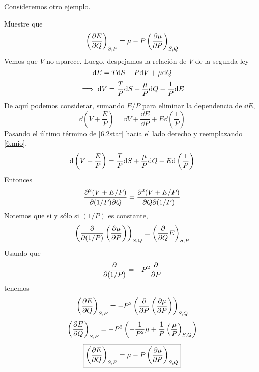 Consideremos otro ejemplo.
\begin{ej}
	Muestre que 
	\begin{equation}
  \left(\pdv{E}{Q}\right)_{S,P}=\mu -P\left(\pdv{\mu}{P}\right)_{S,Q}
\end{equation}
Vemos que $V$ no aparece. Luego, despejamos la relación de $V$ de la segunda ley
\begin{equation}
  \dd E=T\dd S-P\dd V+\mu\dd Q
\end{equation}
\begin{equation}\label{6.2star}
  \implies \dd V=\frac{T}{P}\dd S+\frac{\mu }{P}\dd Q-\frac{1}{P}\dd E
\end{equation}
De aquí podemos considerar, sumando $E/P$ para eliminar la dependencia de $\dd E$,
\begin{equation}\label{6.mio}
  \dd\left(V+\frac{E}{P}\right)=\dd V+\frac{\dd E}{\dd P}+E\dd\left(\frac{1}{P}\right)
\end{equation}
Pasando el último término de \eqref{6.2star} hacia el lado derecho y reemplazando \eqref{6.mio},
\begin{equation}
  \dd\left(V+\frac{E}{P}\right)=\frac{T}{P}\dd S+\frac{\mu }{P}\dd Q-E\dd\left(\frac{1}{P}\right)
\end{equation}
Entonces 
\begin{equation}
  \pdv{(V+E/P)}{(1/P)}{Q}=\pdv{(V+E/P)}{Q}{(1/P)}
\end{equation}
Notemos que si y sólo si $(1/P)$ es constante,
\begin{equation}
  \left(\pdv{(1/P)}\left(\pdv{\mu}{P}\right)\right)_{S,Q}=\left(\pdv{Q}E\right)_{S,P}
\end{equation}
Usando que
\begin{equation}
  \pdv{(1/P)}=-P^2\pdv{P}
\end{equation}
tenemos
\begin{equation}
  \left(\pdv{E}{Q}\right)_{S,P}=-P^2\left(\pdv{P}\left(\pdv{\mu}{P}\right)\right)_{S,Q}
\end{equation}
\begin{equation}
   \left(\pdv{E}{Q}\right)_{S,P}=-P^2\left(-\frac{1}{P^2}\mu +\frac{1}{P}\left(\frac{\mu }{P}\right)_{S,Q}\right)
\end{equation}
\begin{equation}
  \boxed{ \left(\pdv{E}{Q}\right)_{S,P}=\mu -P\left(\pdv{\mu}{P}\right)_{S,Q}}
\end{equation}
\end{ej}

